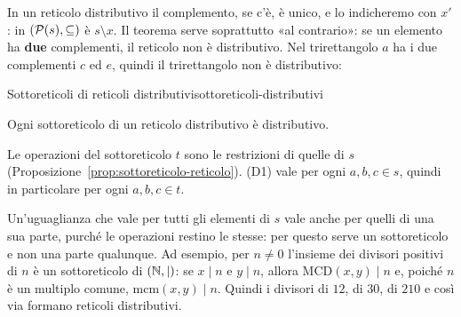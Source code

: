 \begin{spiegazione}
    In un reticolo distributivo il complemento, se c'è, è unico, e lo indicheremo con $x'$: in $(\mathcal{P}(s), \subseteq)$ è $s \setminus x$. Il teorema serve
    soprattutto «al contrario»: se un elemento ha \textbf{due} complementi, il reticolo non è distributivo. Nel trirettangolo $a$ ha i due
    complementi $c$ ed $e$, quindi il trirettangolo non è distributivo:
    \begin{center}
    \end{center}
\end{spiegazione}

\begin{concetto}
\begin{Proposizione}{Sottoreticoli di reticoli distributivi}{sottoreticoli-distributivi}
    \begin{prerequisiti}
    \end{prerequisiti}
    Ogni sottoreticolo di un reticolo distributivo è distributivo.
\end{Proposizione}
\begin{dimostrazione}
    Le operazioni del sottoreticolo $t$ sono le restrizioni di quelle di $s$ (Proposizione~\ref{prop:sottoreticolo-reticolo}). (D1) vale per ogni $a, b, c \in s$, quindi
    in particolare per ogni $a, b, c \in t$.
\end{dimostrazione}
\end{concetto}

\begin{spiegazione}
    Un'uguaglianza che vale per tutti gli elementi di $s$ vale anche per quelli di una sua parte, purché le operazioni restino le stesse:
    per questo serve un sottoreticolo e non una parte qualunque. Ad esempio, per $n \neq 0$ l'insieme dei divisori positivi di $n$ è un sottoreticolo di
    $(\mathbb{N}, \mid)$: se $x \mid n$ e $y \mid n$, allora $\mathrm{MCD}(x, y) \mid n$ e, poiché $n$ è un multiplo comune, $\mathrm{mcm}(x, y) \mid n$. Quindi i divisori di $12$,
    di $30$, di $210$ e così via formano reticoli distributivi.
\end{spiegazione}

